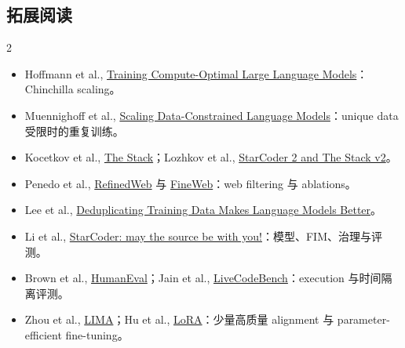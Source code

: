 \subsection{拓展阅读}

\begin{multicols}{2}
\footnotesize
\begin{itemize}
  \setlength{\itemsep}{0.15em}
  \item Hoffmann et al., \href{https://arxiv.org/abs/2203.15556}{Training Compute-Optimal Large Language Models}：Chinchilla scaling。
  \item Muennighoff et al., \href{https://arxiv.org/abs/2305.16264}{Scaling Data-Constrained Language Models}：unique data 受限时的重复训练。
  \item Kocetkov et al., \href{https://arxiv.org/abs/2211.15533}{The Stack}；Lozhkov et al., \href{https://arxiv.org/abs/2402.19173}{StarCoder 2 and The Stack v2}。
  \item Penedo et al., \href{https://arxiv.org/abs/2306.01116}{RefinedWeb} 与 \href{https://arxiv.org/abs/2406.17557}{FineWeb}：web filtering 与 ablations。
  \item Lee et al., \href{https://arxiv.org/abs/2107.06499}{Deduplicating Training Data Makes Language Models Better}。
  \item Li et al., \href{https://arxiv.org/abs/2305.06161}{StarCoder: may the source be with you!}：模型、FIM、治理与评测。
  \item Brown et al., \href{https://arxiv.org/abs/2107.03374}{HumanEval}；Jain et al., \href{https://arxiv.org/abs/2403.07974}{LiveCodeBench}：execution 与时间隔离评测。
  \item Zhou et al., \href{https://arxiv.org/abs/2305.11206}{LIMA}；Hu et al., \href{https://arxiv.org/abs/2106.09685}{LoRA}：少量高质量 alignment 与 parameter-efficient fine-tuning。
\end{itemize}
\end{multicols}


